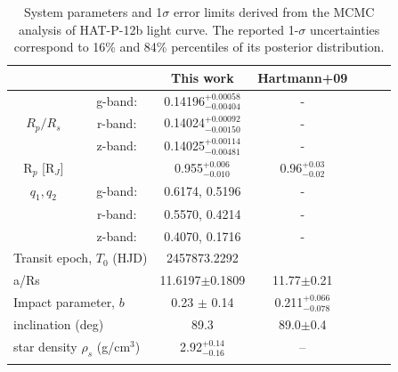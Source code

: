 \begin{table}
\centering
\caption{System parameters and 1$\sigma$ error limits derived from the MCMC analysis of HAT-P-12b light curve. The reported 1-$\sigma$ uncertainties correspond to 16\% and 84\% percentiles of its posterior distribution.}
\begin{tabular}{ccccccc}
\multicolumn{2}{l}{}                           & This work & Hartmann+09 \\ \hline
\multirow{3}{*}{$R_p/R_s$}& g-band:      & 0.14196$_{-0.00404}^{+0.00058}$   & - \\
                          & r-band:      & 0.14024$_{-0.00150}^{+0.00092}$   & - \\
                          & z-band:      & 0.14025$_{-0.00481}^{+0.00114}$   & - \\ \hline
R$_p$ [R$_J$]             & & 0.955$^{+0.006}_{-0.010}$ & 0.96$^{+0.03}_{-0.02}$\\
$q_1, q_2$                & g-band:      & 0.6174, 0.5196   & -     \\
                          & r-band:      & 0.5570, 0.4214   & -     \\
                          & z-band:      & 0.4070,  0.1716  & -     \\ \hline
\multicolumn{2}{l}{Transit epoch, $T_0$ (HJD)} & 2457873.2292	  &      \\
\multicolumn{2}{l}{a/Rs}                     & 11.6197$\pm$0.1809 & 11.77$\pm$0.21 \\
\multicolumn{2}{l}{Impact parameter, $b$}    & 0.23 $\pm$ 0.14  & 0.211$^{+0.066}_{-0.078}$  \\
\multicolumn{2}{l}{inclination (deg)}        & 89.3             & 89.0$\pm$0.4  \\  
\multicolumn{2}{l}{star density $\rho_s$ (g/cm$^3$)}        & 2.92$_{-0.16}^{+0.14}$  &  --  \\  
\hline  
\label{tab:hatp12_map}
\end{tabular}
\end{table}

